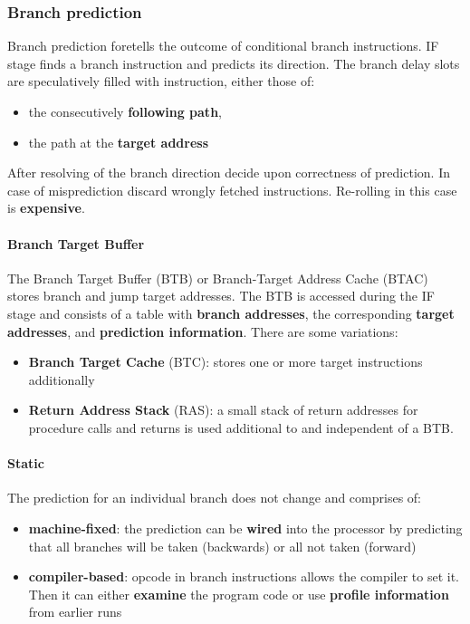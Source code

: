\subsubsection{Branch prediction}
Branch prediction foretells the outcome of conditional branch instructions. IF stage finds a branch instruction and predicts its direction. The branch delay slots are speculatively filled with instruction, either those of:
\begin{itemize}
	\item the consecutively \textbf{following path},
	\item the path at the \textbf{target address}
\end{itemize}
After resolving of the branch direction decide upon correctness of prediction. In case of misprediction discard wrongly fetched instructions. Re-rolling in this case is \textbf{expensive}.

\paragraph{Branch Target Buffer}
The Branch Target Buffer (BTB) or Branch-Target Address Cache (BTAC) stores branch and jump target
addresses. The BTB is accessed during the IF stage and consists of a table with \textbf{branch addresses}, the corresponding \textbf{target addresses}, and \textbf{prediction information}.
There are some variations:
\begin{itemize}
	\item \textbf{Branch Target Cache} (BTC): stores one or more target instructions additionally
	\item \textbf{Return Address Stack} (RAS): a small stack of return addresses for procedure calls and returns is used additional to and independent of a BTB.
\end{itemize}

\paragraph{Static}
The prediction for an individual branch	does not change and comprises of:
\begin{itemize}
	\item \textbf{machine-fixed}: the prediction can be \textbf{wired} into the processor by predicting that all branches will be taken (backwards) or all not taken (forward)
	\item \textbf{compiler-based}: opcode in branch instructions allows the compiler to set it. Then it can either \textbf{examine} the program code or use \textbf{profile information} from earlier runs
\end{itemize}

